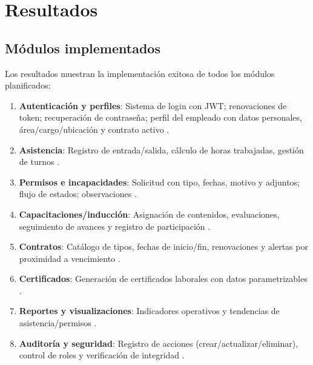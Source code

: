 \section{Resultados}

\subsection{Módulos implementados}
Los resultados muestran la implementación exitosa de todos los módulos planificados:

\begin{enumerate}
    \item \textbf{Autenticación y perfiles}: Sistema de login con JWT; renovaciones de token; recuperación de contraseña; perfil del empleado con datos personales, área/cargo/ubicación y contrato activo \cite{estudio_aplicaciones_java}\cite{analisis_google_charts}\cite{gestion_talento_digital}.
    \item \textbf{Asistencia}: Registro de entrada/salida, cálculo de horas trabajadas, gestión de turnos \cite{estudio_aplicaciones_java}\cite{analisis_google_charts}\cite{gestion_talento_digital}.
    \item \textbf{Permisos e incapacidades}: Solicitud con tipo, fechas, motivo y adjuntos; flujo de estados; observaciones \cite{estudio_aplicaciones_java}\cite{analisis_google_charts}\cite{gestion_talento_digital}.
    \item \textbf{Capacitaciones/inducción}: Asignación de contenidos, evaluaciones, seguimiento de avances y registro de participación \cite{estudio_aplicaciones_java}\cite{analisis_google_charts}\cite{gestion_talento_digital}.
    \item \textbf{Contratos}: Catálogo de tipos, fechas de inicio/fin, renovaciones y alertas por proximidad a vencimiento \cite{estudio_aplicaciones_java}\cite{analisis_google_charts}\cite{gestion_talento_digital}.
    \item \textbf{Certificados}: Generación de certificados laborales con datos parametrizables \cite{estudio_aplicaciones_java}\cite{analisis_google_charts}\cite{gestion_talento_digital}.
    \item \textbf{Reportes y visualizaciones}: Indicadores operativos y tendencias de asistencia/permisos \cite{estudio_aplicaciones_java}\cite{analisis_google_charts}\cite{gestion_talento_digital}.
    \item \textbf{Auditoría y seguridad}: Registro de acciones (crear/actualizar/eliminar), control de roles y verificación de integridad \cite{estudio_aplicaciones_java}\cite{analisis_google_charts}\cite{gestion_talento_digital}.
\end{enumerate}

